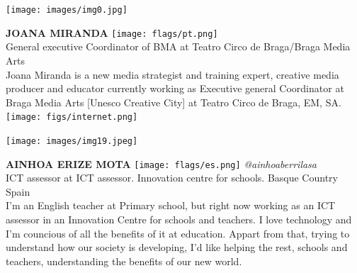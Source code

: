 \documentclass[11pt]{article}
\begin{document}
\noindent
\begin{minipage}{0.3\textwidth}
\centering
\texttt{[image: images/img0.jpg]}
\end{minipage}
\hfill
\begin{minipage}{0.6\textwidth}\raggedright
\color{color1}\uppercase{\textbf{Joana Miranda}}
\color{color2}\hspace{0.2cm}\texttt{[image: flags/pt.png]}
\\
General executive Coordinator of BMA at Teatro Circo de Braga/Braga Media Arts\\
{\footnotesize Joana Miranda is a new media strategist and training expert, creative media producer and educator currently working as Executive general Coordinator at Braga Media Arts [Unesco Creative City] at Teatro Circo de Braga, EM, SA.}\\
\texttt{[image: figs/internet.png]}
\end{minipage}
\newline\newline\newline

\noindent
\begin{minipage}{0.3\textwidth}
\centering
\texttt{[image: images/img19.jpeg]}
\end{minipage}
\hfill
\begin{minipage}{0.6\textwidth}\raggedright
\color{color1}\uppercase{\textbf{Ainhoa Erize Mota}}
\color{color2}\hspace{0.2cm}\texttt{[image: flags/es.png]}
\hspace{0.2cm}\textit{@ainhoaberrilasa}
\\
ICT assessor at ICT assessor. Innovation centre for schools. Basque Country Spain\\
{\footnotesize I'm an English teacher at Primary school, but right now working as an ICT assessor in an Innovation Centre for schools and teachers. I love technology and I'm councious of all the benefits of it at education. Appart from that, trying to understand how our society is developing, I'd like helping the rest, schools and teachers, understanding the benefits of our new world. }\\
\end{minipage}
\newline\newline\newline
\end{document}
